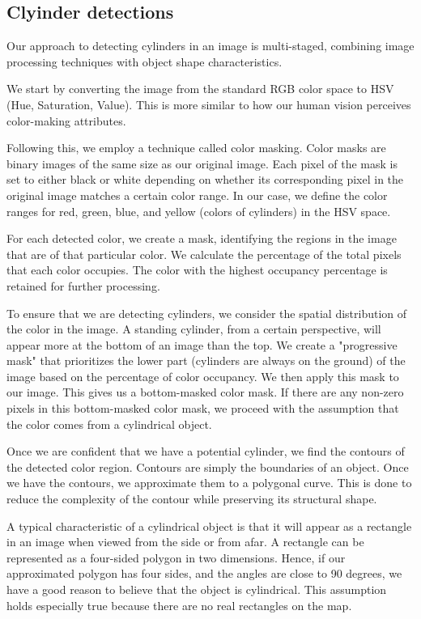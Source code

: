 \documentclass{article}
\begin{document}
\subsection{Clyinder detections}
Our approach to detecting cylinders in an image is multi-staged, combining image processing techniques with object shape characteristics. 

We start by converting the image from the standard RGB color space to HSV (Hue, Saturation, Value). This is more similar to how our human vision perceives color-making attributes. 

Following this, we employ a technique called color masking. Color masks are binary images of the same size as our original image. Each pixel of the mask is set to either black or white depending on whether its corresponding pixel in the original image matches a certain color range. In our case, we define the color ranges for red, green, blue, and yellow (colors of cylinders) in the HSV space. 

For each detected color, we create a mask, identifying the regions in the image that are of that particular color. We calculate the percentage of the total pixels that each color occupies. The color with the highest occupancy percentage is retained for further processing.

To ensure that we are detecting cylinders, we consider the spatial distribution of the color in the image. A standing cylinder, from a certain perspective, will appear more at the bottom of an image than the top. We create a "progressive mask" that prioritizes the lower part (cylinders are always on the ground) of the image based on the percentage of color occupancy. We then apply this mask to our image. This gives us a bottom-masked color mask. If there are any non-zero pixels in this bottom-masked color mask, we proceed with the assumption that the color comes from a cylindrical object.

Once we are confident that we have a potential cylinder, we find the contours of the detected color region. Contours are simply the boundaries of an object. Once we have the contours, we approximate them to a polygonal curve. This is done to reduce the complexity of the contour while preserving its structural shape. 

A typical characteristic of a cylindrical object is that it will appear as a rectangle in an image when viewed from the side or from afar. A rectangle can be represented as a four-sided polygon in two dimensions. Hence, if our approximated polygon has four sides, and the angles are close to 90 degrees, we have a good reason to believe that the object is cylindrical. This assumption holds especially true because there are no real rectangles on the map.
\end{document}

